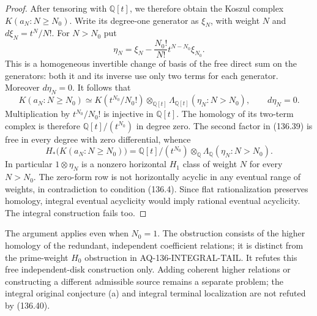 \begin{proof}
After tensoring with $\mathbb Q[t]$, we therefore
obtain the Koszul complex $K(a_N:N\geq N_0)$.
Write its degree-one generator as $\xi_N$, with
weight $N$ and $d\xi_N=t^N/N!$.  For $N>N_0$ put
\[
 \eta_N=\xi_N-
              \frac{N_0!}{N!}t^{N-N_0}\xi_{N_0}.
                                                               \tag{136.38}
\]
This is a homogeneous invertible change of basis
of the free direct sum on the generators: both
it and its inverse use only two terms for each
generator.  Moreover $d\eta_N=0$.  It follows that
\[
 K(a_N:N\geq N_0)
  \simeq K(t^{N_0}/N_0!)\otimes_{\mathbb Q[t]}
                 \Lambda_{\mathbb Q[t]}(\eta_N:N>N_0),
                  \qquad d\eta_N=0.                       \tag{136.39}
\]
Multiplication by $t^{N_0}/N_0!$ is injective in
$\mathbb Q[t]$.  The homology of its two-term complex
is therefore $\mathbb Q[t]/(t^{N_0})$ in degree zero.
The second factor in (136.39) is free in every
degree with zero differential, whence
\[
 H_*\bigl(K(a_N:N\geq N_0)\bigr)
  =\mathbb Q[t]/(t^{N_0})\otimes_{\mathbb Q}
                         \Lambda_{\mathbb Q}(\eta_N:N>N_0).
                                                               \tag{136.40}
\]
In particular $1\otimes\eta_N$ is a nonzero
horizontal $H_1$ class of weight $N$ for every
$N>N_0$.  The zero-form row is not horizontally
acyclic in any eventual range of weights, in
contradiction to condition (136.4).  Since flat
rationalization preserves homology, integral
eventual acyclicity would imply rational eventual
acyclicity.  The integral construction fails too.
\end{proof}

The argument applies even when $N_0=1$.  The
obstruction consists of the higher homology of
the redundant, independent coefficient relations;
it is distinct from the prime-weight $H_0$
obstruction in AQ-136-INTEGRAL-TAIL.  It refutes
this free independent-disk construction only.
Adding coherent higher relations or constructing
a different admissible source remains a separate
problem; the integral original conjecture (a)
and integral terminal localization are not
refuted by (136.40).
